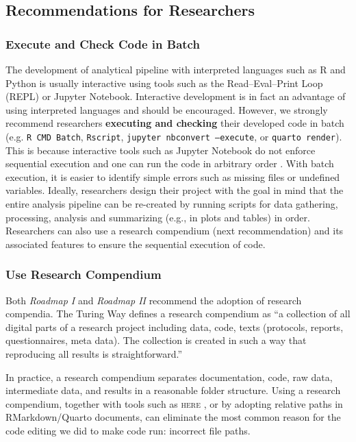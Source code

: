 \subsection{Recommendations for Researchers}
\label{subsec:recsres}

\subsubsection{Execute and Check Code in Batch}

The development of analytical pipeline with interpreted languages such as R and Python is usually interactive using tools such as the Read–Eval–Print Loop (REPL) or Jupyter Notebook. Interactive development is in fact an advantage of using interpreted languages and should be encouraged. However, we strongly recommend researchers \textbf{executing and checking} their developed code in batch (e.g. \texttt{R CMD Batch}, \texttt{Rscript}, \texttt{jupyter nbconvert --execute}, or \texttt{quarto render}). This is because interactive tools such as Jupyter Notebook do not enforce sequential execution and one can run the code in arbitrary order \parencite[]{samuel2023computational}. With batch execution, it is easier to identify simple errors such as missing files or undefined variables. Ideally, researchers design their project with the goal in mind that the entire analysis pipeline can be re-created by running scripts for data gathering, processing, analysis and summarizing (e.g., in plots and tables) in order. Researchers can also use a research compendium (next recommendation) and its associated features to ensure the sequential execution of code.

\subsubsection{Use Research Compendium}

Both \textit{Roadmap I} and \textit{Roadmap II} recommend the adoption of research compendia. The Turing Way \parencite[]{The_Turing_Way:2022} defines a research compendium as ``a collection of all digital parts of a research project including data, code, texts (protocols, reports, questionnaires, meta data). The collection is created in such a way that reproducing all results is straightforward.''

In practice, a research compendium separates documentation, code, raw data, intermediate data, and results in a reasonable folder structure. Using a research compendium, together with tools such as \textsc{here} \parencite{hererpkg}, or by adopting relative paths in RMarkdown/Quarto documents, can eliminate the most common reason for the code editing we did to make code run: incorrect file paths.

